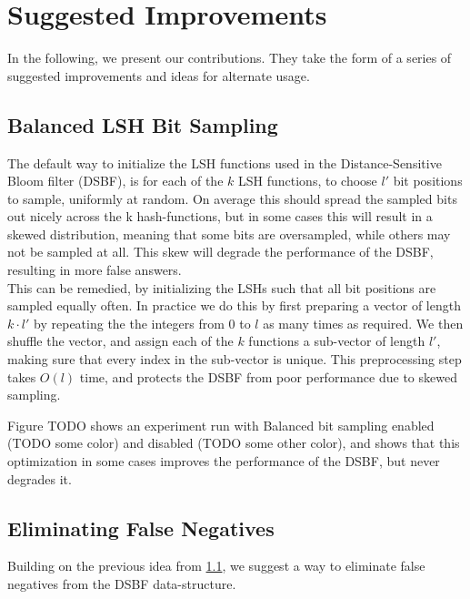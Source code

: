 \documentclass[a4paper,11pt]{article}
\begin{document}

\section{Suggested Improvements}
In the following, we present our contributions. They take the form of a series of suggested improvements and ideas for alternate usage.

\subsection{Balanced LSH Bit Sampling} \label{sec:balanced}
The default way to initialize the LSH functions used in the Distance-Sensitive Bloom filter (DSBF), is for each of the $k$ LSH functions, to choose $l'$ bit positions to sample, uniformly at random. On average this should spread the sampled bits out nicely across the k hash-functions, but in some cases this will result in a skewed distribution, meaning that some bits are oversampled, while others may not be sampled at all. This skew will degrade the performance of the DSBF, resulting in more false answers.
\\
This can be remedied, by initializing the LSHs such that all bit positions are sampled equally often.
In practice we do this by first preparing a vector of length $k \cdot l'$ by repeating the the integers from 0 to $l$ as many times as required. We then shuffle the vector, and assign each of the $k$ functions a sub-vector of length $l'$, making sure that every index in the sub-vector is unique. This preprocessing step takes $O(l)$ time, and protects the DSBF from poor performance due to skewed sampling.

Figure TODO shows an experiment run with Balanced bit sampling enabled (TODO some color) and disabled (TODO some other color), and shows that this optimization in some cases improves the performance of the DSBF, but never degrades it.

\subsection{Eliminating False Negatives}
Building on the previous idea from \ref{sec:balanced}, we suggest a way to eliminate false negatives from the DSBF data-structure.
\end{document}
